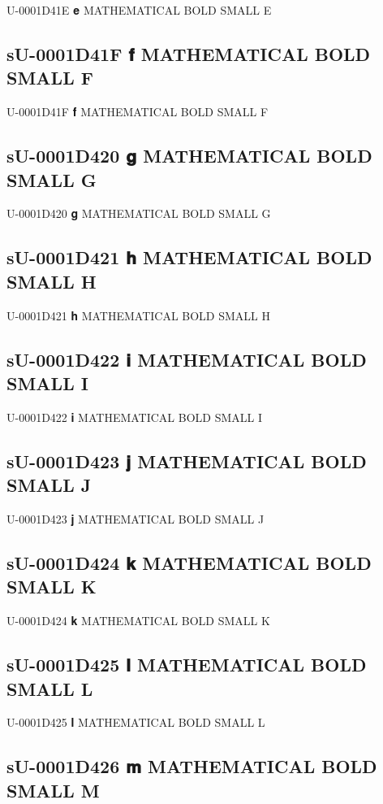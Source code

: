 U-0001D41E 𝐞 MATHEMATICAL BOLD SMALL E

\subsection{sU-0001D41F 𝐟 MATHEMATICAL BOLD SMALL F}

U-0001D41F 𝐟 MATHEMATICAL BOLD SMALL F

\subsection{sU-0001D420 𝐠 MATHEMATICAL BOLD SMALL G}

U-0001D420 𝐠 MATHEMATICAL BOLD SMALL G

\subsection{sU-0001D421 𝐡 MATHEMATICAL BOLD SMALL H}

U-0001D421 𝐡 MATHEMATICAL BOLD SMALL H

\subsection{sU-0001D422 𝐢 MATHEMATICAL BOLD SMALL I}

U-0001D422 𝐢 MATHEMATICAL BOLD SMALL I

\subsection{sU-0001D423 𝐣 MATHEMATICAL BOLD SMALL J}

U-0001D423 𝐣 MATHEMATICAL BOLD SMALL J

\subsection{sU-0001D424 𝐤 MATHEMATICAL BOLD SMALL K}

U-0001D424 𝐤 MATHEMATICAL BOLD SMALL K

\subsection{sU-0001D425 𝐥 MATHEMATICAL BOLD SMALL L}

U-0001D425 𝐥 MATHEMATICAL BOLD SMALL L

\subsection{sU-0001D426 𝐦 MATHEMATICAL BOLD SMALL M}

